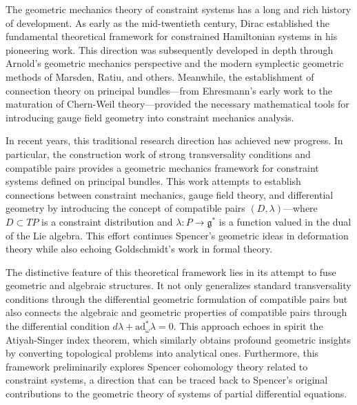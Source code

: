 \documentclass[a4paper,12pt]{extarticle}
\theoremstyle{definition}
\begin{document}
The geometric mechanics theory of constraint systems has a long and rich history of development. As early as the mid-twentieth century, Dirac established the fundamental theoretical framework for constrained Hamiltonian systems in his pioneering work\cite{dirac1950generalized,dirac1958theory}. This direction was subsequently developed in depth through Arnold's geometric mechanics perspective\cite{arnold1978mathematical} and the modern symplectic geometric methods of Marsden, Ratiu, and others\cite{marsden1999introduction}. Meanwhile, the establishment of connection theory on principal bundles—from Ehresmann's early work\cite{ehresmann1950connexions} to the maturation of Chern-Weil theory\cite{chern1944gaussian,weil1949invariants}—provided the necessary mathematical tools for introducing gauge field geometry into constraint mechanics analysis.

In recent years, this traditional research direction has achieved new progress. In particular, the construction work of strong transversality conditions and compatible pairs\cite{zheng2025dynamical} provides a geometric mechanics framework for constraint systems defined on principal bundles. This work attempts to establish connections between constraint mechanics, gauge field theory, and differential geometry by introducing the concept of compatible pairs $(D, \lambda)$—where $D \subset TP$ is a constraint distribution and $\lambda: P \to \mathfrak{g}^*$ is a function valued in the dual of the Lie algebra. This effort continues Spencer's geometric ideas in deformation theory\cite{spencer1962deformations} while also echoing Goldschmidt's work in formal theory\cite{goldschmidt1973integrability}.

The distinctive feature of this theoretical framework lies in its attempt to fuse geometric and algebraic structures. It not only generalizes standard transversality conditions through the differential geometric formulation of compatible pairs but also connects the algebraic and geometric properties of compatible pairs through the differential condition $d\lambda + \text{ad}_\omega^* \lambda = 0$. This approach echoes in spirit the Atiyah-Singer index theorem\cite{atiyah1963index}, which similarly obtains profound geometric insights by converting topological problems into analytical ones. Furthermore, this framework preliminarily explores Spencer cohomology theory related to constraint systems, a direction that can be traced back to Spencer's original contributions to the geometric theory of systems of partial differential equations\cite{spencer1970overdetermined}.
\end{document}

